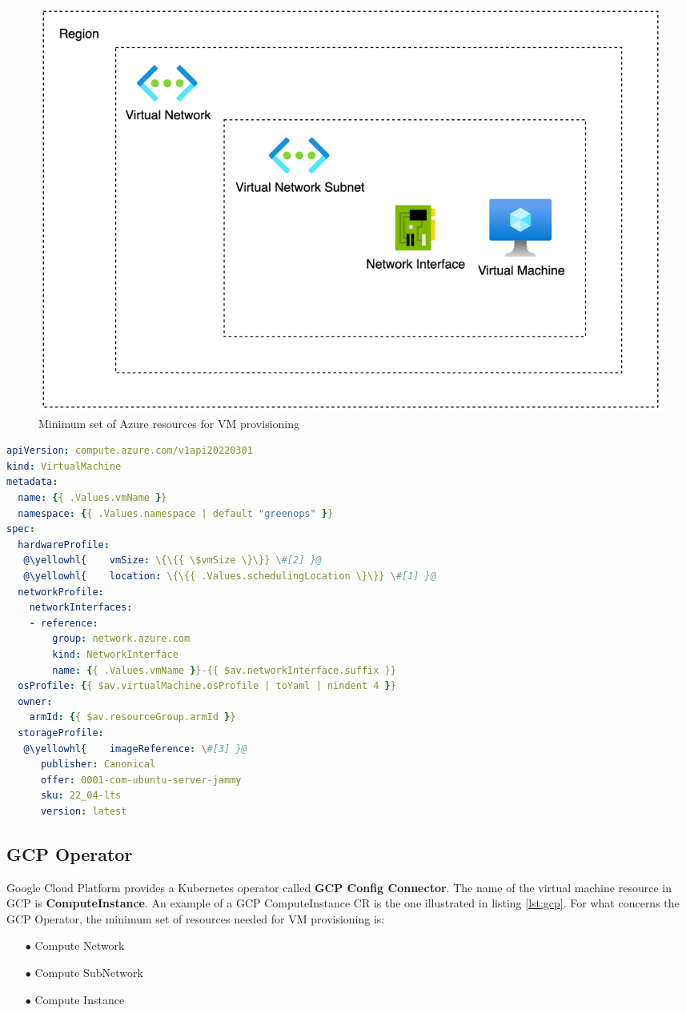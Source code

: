 \begin{figure}[H]
\centering
\includegraphics[width=0.75\linewidth]{images/azure.png}
\caption{Minimum set of Azure resources for VM provisioning}
\label{fig:azure}
\end{figure}

\begin{lstlisting}[language=yaml, caption={Azure Instance Custom Resource}, label={lst:azure}]
apiVersion: compute.azure.com/v1api20220301
kind: VirtualMachine
metadata:
  name: {{ .Values.vmName }}
  namespace: {{ .Values.namespace | default "greenops" }}
spec:
  hardwareProfile:
   @\yellowhl{    vmSize: \{\{{ \$vmSize \}\}} \#[2] }@
   @\yellowhl{    location: \{\{{ .Values.schedulingLocation \}\}} \#[1] }@
  networkProfile:
    networkInterfaces:
    - reference:
        group: network.azure.com
        kind: NetworkInterface
        name: {{ .Values.vmName }}-{{ $av.networkInterface.suffix }}
  osProfile: {{ $av.virtualMachine.osProfile | toYaml | nindent 4 }}
  owner:
    armId: {{ $av.resourceGroup.armId }}
  storageProfile:
   @\yellowhl{    imageReference: \#[3] }@
      publisher: Canonical
      offer: 0001-com-ubuntu-server-jammy
      sku: 22_04-lts
      version: latest
\end{lstlisting}

\subsection{GCP Operator}

Google Cloud Platform provides a Kubernetes operator called \textbf{GCP Config Connector}.
The name of the virtual machine resource in GCP is \textbf{ComputeInstance}.
An example of a GCP ComputeInstance CR is the one illustrated in listing \ref{lst:gcp}.
For what concerns the GCP Operator, the minimum set of resources needed for VM provisioning is:

\begin{itemize}[itemsep=0.2pt, topsep=1pt] 
  \item[$\bullet$] Compute Network
  \item[$\bullet$] Compute SubNetwork
  \item[$\bullet$] Compute Instance
  \end{itemize}

